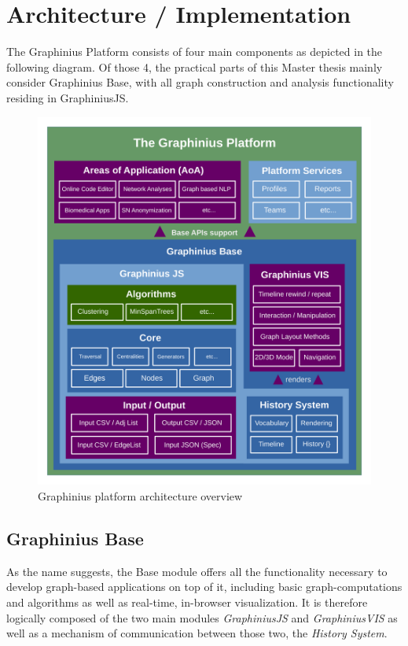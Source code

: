 
\chapter{Architecture / Implementation}
\label{ch:implementation}

The Graphinius Platform consists of four main components as depicted in the following diagram. Of those 4, the practical parts of this Master thesis mainly consider Graphinius Base, with all graph construction and analysis functionality residing in GraphiniusJS. 

\begin{figure}[H]
	\centering
	\hspace*{-0.5cm}
	\includegraphics[width=1.05\textwidth]{figures/Graphinius_Architecture_new}
	\caption{Graphinius platform architecture overview}
	\label{fig:graphinius_architecture}
\end{figure}


\section{Graphinius Base}
\label{sect:graphinius_base}

As the name suggests, the Base module offers all the functionality necessary to develop graph-based applications on top of it, including basic graph-computations and algorithms as well as real-time, in-browser visualization. It is therefore logically composed of the two main modules \textit{GraphiniusJS} and \textit{GraphiniusVIS} as well as a mechanism of communication between those two, the \textit{History System}.

